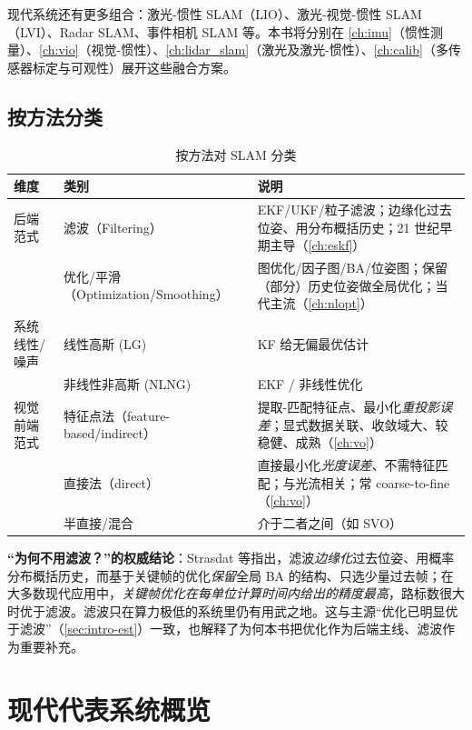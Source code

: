 \noindent 现代系统还有更多组合：激光-惯性 SLAM（LIO）、激光-视觉-惯性 SLAM（LVI）、Radar SLAM、事件相机 SLAM 等。本书将分别在 \cref{ch:imu}（惯性测量）、\cref{ch:vio}（视觉-惯性）、\cref{ch:lidar_slam}（激光及激光-惯性）、\cref{ch:calib}（多传感器标定与可观性）展开这些融合方案。

\subsection{按方法分类}
\label{sec:intro-by-method}
\begin{table}[H]\centering\small
\caption{按方法对 SLAM 分类}
\label{tab:intro-class-method}
\begin{tabular}{p{} p{} p{}}
\toprule
维度 & 类别 & 说明 \\
\midrule
后端范式 & 滤波（Filtering） & EKF/UKF/粒子滤波；边缘化过去位姿、用分布概括历史；21 世纪早期主导（\cref{ch:eskf}） \\
 & 优化/平滑（Optimization/Smoothing） & 图优化/因子图/BA/位姿图；保留（部分）历史位姿做全局优化；当代主流（\cref{ch:nlopt}） \\
系统线性/噪声 & 线性高斯 (LG) & KF 给无偏最优估计 \\
 & 非线性非高斯 (NLNG) & EKF / 非线性优化 \\
视觉前端范式 & 特征点法（feature-based/indirect） & 提取-匹配特征点、最小化\emph{重投影误差}；显式数据关联、收敛域大、较稳健、成熟（\cref{ch:vo}） \\
 & 直接法（direct） & 直接最小化\emph{光度误差}、不需特征匹配；与光流相关；常 coarse-to-fine（\cref{ch:vo}） \\
 & 半直接/混合 & 介于二者之间（如 SVO） \\
\bottomrule
\end{tabular}
\end{table}

\begin{insight}
\textbf{“为何不用滤波？”的权威结论}：Strasdat 等指出，滤波\emph{边缘化}过去位姿、用概率分布概括历史，而基于关键帧的优化\emph{保留}全局 BA 的结构、只选少量过去帧；在大多数现代应用中，\emph{关键帧优化在每单位计算时间内给出的精度最高}，路标数很大时优于滤波。滤波只在算力极低的系统里仍有用武之地。这与主源“优化已明显优于滤波”（\cref{sec:intro-est}）一致，也解释了为何本书把优化作为后端主线、滤波作为重要补充。
\end{insight}

\section{现代代表系统概览}
\label{sec:intro-systems}

